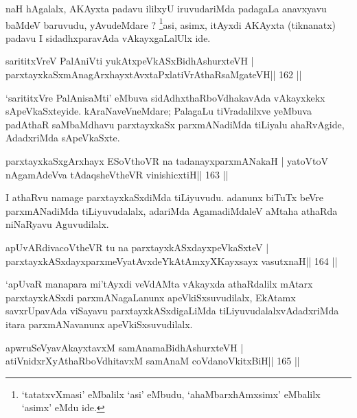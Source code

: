 \begin{artha}
naH hAgalalx, AKAyxta padavu ililxyU iruvudariMda padagaLa anavxyavu baMdeV baruvudu, yAvudeMdare ? \footnote[1]{`tatatxvXmasi' eMbalilx `asi' eMbudu, `ahaMbarxhAmxsimx' eMbalilx `asimx' eMdu ide.}asi, asimx, itAyxdi AKAyxta (tiknanatx) padavu I sidadhxparavAda vAkayxgaLalUlx ide.
\end{artha}


\begin{shl}
sarititxVreV PalAniVti yukAtx\s peVkASx\s BidhAshurxteVH |
parxtayxkaSxmAnagArxhayxtAvxtaPxlatiVrAthaRsaMgateVH\hfill || 162 ||
\end{shl}

\begin{artha}
`sarititxVre PalAnisaMti' eMbuva sidAdhxthaRboVdhakavAda vAkayxkekx sApeVkaSxteyide. kAraNaveVneMdare; PalagaLu tiVradalilxve yeMbuva padAthaR saMbaMdhavu parxtayxkaSx parxmA\-NadiMda tiLiyalu ahaRvAgide, AdadxriMda sApeVkaSxte.
\end{artha}

\begin{shl}
parxtayxkaSxgArxhayx ESoV\s thoVR na tadanayxparxmANakaH |
yatoV\s toV nA\s\s gamAdeVva tAdaqsheV\s theVR vinishicxtiH\hfill || 163 ||
\end{shl}

\begin{artha}
I athaRvu namage parxtayxkaSxdiMda tiLiyuvudu. adanunx biTuTx beVre parxmANadiMda tiLiyuvudalalx, adariMda AgamadiMdaleV aMtaha athaRda niNaRyavu Aguvudilalx.
\end{artha}

\begin{shl}
apUvARdivacoV\s theVR tu na parxtayxkASxdayxpeVkaSxteV |
parxtayxkASxdayxparxmeVyatAvxdeYkAtAmxyXKayxsayx vasutxnaH\hfill || 164 ||
\end{shl}

\begin{artha}
`apUvaR manapara mi'tAyxdi veVdAMta vAkayxda athaRdalilx mAtarx parxtayxkASxdi parxmANagaLanunx apeVkiSxsuvudilalx, EkAtamx savxrUpavAda viSayavu parxtayxkASxdigaLiMda tiLiyuvudalalxvAdadxriMda itara parxmANavanunx apeVkiSxsuvudilalx.
\end{artha}

\begin{shl}
apwruSeVyavAkayxtavxM samAnamaBidhAshurxteVH |
atiVnidxrXyAthaRboVdhitavxM samAnaM coVdanoVkitxBiH\hfill || 165 ||
\end{shl}

